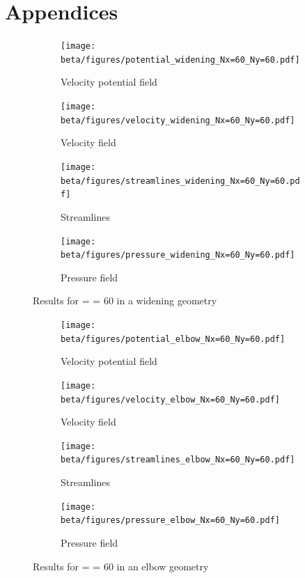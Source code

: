 \part{Appendices}\label{sec:appendix}
\begin{figure}[htbp]
      \centering
      \begin{subfigure}{.45\textwidth}
            \texttt{[image: beta/figures/potential\_widening\_Nx=60\_Ny=60.pdf]}
            \caption{Velocity potential field}\label{fig:vel_pot_field_wid}
      \end{subfigure}
      \begin{subfigure}{.45\textwidth}
            \texttt{[image: beta/figures/velocity\_widening\_Nx=60\_Ny=60.pdf]}
            \caption{Velocity field}\label{fig:velocity_field_wid}
      \end{subfigure}

      \centering
      \begin{subfigure}{.45\textwidth}
            \texttt{[image: beta/figures/streamlines\_widening\_Nx=60\_Ny=60.pdf]}
            \caption{Streamlines}\label{fig:streamlines_wid}
      \end{subfigure}
      \begin{subfigure}{.45\textwidth}
            \texttt{[image: beta/figures/pressure\_widening\_Nx=60\_Ny=60.pdf]}
            \caption{Pressure field}\label{fig:pressure_field_wid}
      \end{subfigure}
      \caption{Results for  =  = \num{60} in a widening geometry}
\end{figure}

\newpage

\begin{figure}[htbp]
      \centering
      \begin{subfigure}{.45\textwidth}
            \texttt{[image: beta/figures/potential\_elbow\_Nx=60\_Ny=60.pdf]}
            \caption{Velocity potential field}\label{fig:vel_pot_field_el}
      \end{subfigure}
      \begin{subfigure}{.45\textwidth}
            \texttt{[image: beta/figures/velocity\_elbow\_Nx=60\_Ny=60.pdf]}
            \caption{Velocity field}\label{fig:velocity_field_el}
      \end{subfigure}

      \centering
      \begin{subfigure}{.45\textwidth}
            \texttt{[image: beta/figures/streamlines\_elbow\_Nx=60\_Ny=60.pdf]}
            \caption{Streamlines}\label{fig:streamlines_el}
      \end{subfigure}
      \begin{subfigure}{.45\textwidth}
            \texttt{[image: beta/figures/pressure\_elbow\_Nx=60\_Ny=60.pdf]}
            \caption{Pressure field}\label{fig:pressure_field_el}
      \end{subfigure}
      \caption{Results for  =  = \num{60} in an elbow geometry}
\end{figure}

